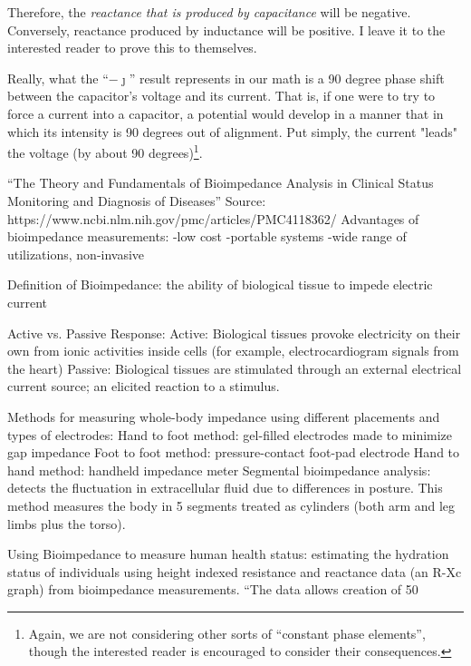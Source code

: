 \documentclass[11pt]{book}
\begin{document}
Therefore, the \textit{reactance that is produced by capacitance} will be negative. Conversely, reactance produced by inductance will be positive. I leave it to the interested reader to prove this to themselves.

Really, what the ``$-\jmath$'' result represents in our math is a 90 degree phase shift between the capacitor's voltage and its current. That is, if one were to try to force a current into a capacitor, a potential would develop in a manner that in which its intensity is 90 degrees out of alignment. Put simply, the current "leads" the voltage (by about 90 degrees)\footnote{Again, we are not considering other sorts of ``constant phase elements'', though the interested reader is encouraged to consider their consequences.}.

“The Theory and Fundamentals of Bioimpedance Analysis in Clinical Status Monitoring and Diagnosis of Diseases”
Source: https://www.ncbi.nlm.nih.gov/pmc/articles/PMC4118362/ 
Advantages of bioimpedance measurements: 
-low cost
-portable systems
-wide range of utilizations, non-invasive

Definition of Bioimpedance: the ability of biological tissue to impede electric current

Active vs. Passive Response:
Active: Biological tissues provoke electricity on their own from ionic activities inside cells (for example, electrocardiogram signals from the heart)
Passive: Biological tissues are stimulated through an external electrical current source; an elicited reaction to a stimulus.

Methods for measuring whole-body impedance using different placements and types of electrodes:
Hand to foot method: gel-filled electrodes made to minimize gap impedance
Foot to foot method: pressure-contact foot-pad electrode
Hand to hand method: handheld impedance meter
Segmental bioimpedance analysis: detects the fluctuation in extracellular fluid due to differences in posture. This method measures the body in 5 segments treated as cylinders (both arm and leg limbs plus the torso). 

Using Bioimpedance to measure human health status: estimating the hydration status of individuals using height indexed resistance and reactance data (an R-Xc graph) from bioimpedance measurements. “The data allows creation of 50%
\end{document}
